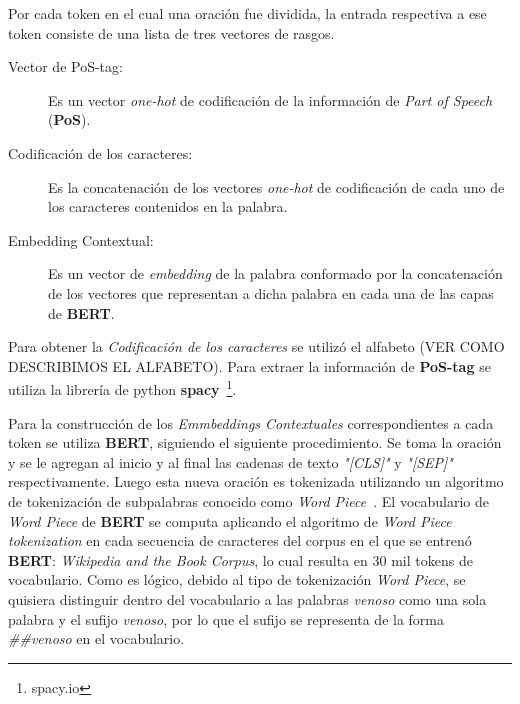 Por cada token en el cual una oraci\'on fue dividida, la entrada respectiva a ese token consiste de una lista de tres vectores de rasgos.

\begin{description}
	\item[Vector de PoS-tag:] Es un vector \emph{one-hot} de codificaci\'on de la informaci\'on de \emph{Part of Speech} (\textbf{PoS}).
	\item[Codificaci\'on de los caracteres:] Es la concatenaci\'on de los vectores \emph{one-hot} de codificaci\'on de cada uno de los caracteres contenidos en la palabra. 
	\item[Embedding Contextual:] Es un vector de \emph{embedding} de la palabra conformado por la concatenaci\'on de los vectores que representan a dicha palabra en cada una de las capas de \textbf{BERT}.
	 
\end{description} 

Para obtener la \emph{Codificaci\'on de los caracteres} se utiliz\'o el alfabeto (VER COMO DESCRIBIMOS EL ALFABETO). Para extraer la informaci\'on de \textbf{PoS-tag} se utiliza la librer\'ia de python \textbf{spacy}~\footnote{spacy.io}. 

Para la construcci\'on de los \emph{Emmbeddings Contextuales} correspondientes a cada token se utiliza \textbf{BERT}, siguiendo el siguiente procedimiento. Se toma la oraci\'on y se le agregan al inicio y al final las cadenas de texto \emph{"[CLS]"} y \emph{"[SEP]"} respectivamente. Luego esta nueva oraci\'on es tokenizada utilizando un algoritmo de tokenizaci\'on de subpalabras conocido como \emph{Word Piece}~\cite{schuster2012japanese}. El vocabulario de \emph{Word Piece} de \textbf{BERT} se computa aplicando el algoritmo de \emph{Word Piece tokenization} en cada secuencia de caracteres del corpus en el que se entren\'o \textbf{BERT}: \emph{Wikipedia and the Book Corpus}, lo cual resulta en 30 mil tokens de vocabulario. Como es l\'ogico, debido al tipo de tokenizaci\'on \emph{Word Piece}, se quisiera distinguir dentro del vocabulario a las palabras \emph{venoso} como una sola palabra y el sufijo \emph{venoso}, por lo que el sufijo se representa de la forma \emph{\#\#venoso} en el vocabulario.


